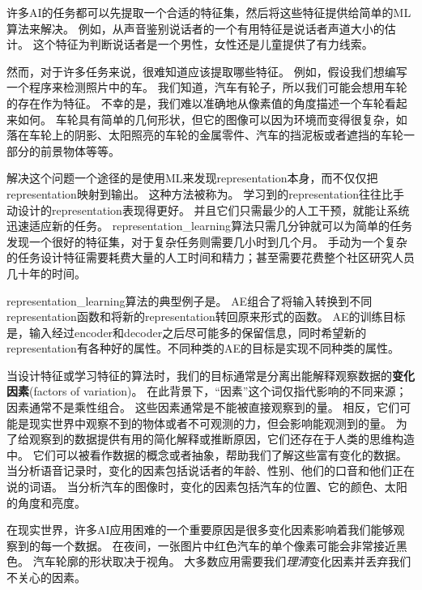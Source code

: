 许多\gls{AI}的任务都可以先提取一个合适的特征集，然后将这些特征提供给简单的\gls{ML}算法来解决。
例如，从声音鉴别说话者的一个有用特征是说话者声道大小的估计。
这个特征为判断说话者是一个男性，女性还是儿童提供了有力线索。

然而，对于许多任务来说，很难知道应该提取哪些特征。
例如，假设我们想编写一个程序来检测照片中的车。
我们知道，汽车有轮子，所以我们可能会想用车轮的存在作为特征。
不幸的是，我们难以准确地从像素值的角度描述一个车轮看起来如何。
车轮具有简单的几何形状，但它的图像可以因为环境而变得很复杂，如落在车轮上的阴影、太阳照亮的车轮的金属零件、汽车的挡泥板或者遮挡的车轮一部分的前景物体等等。


解决这个问题一个途径的是使用\gls{ML}来发现\gls{representation}本身，而不仅仅把\gls{representation}映射到输出。
这种方法被称为。
学习到的\gls{representation}往往比手动设计的\gls{representation}表现得更好。
并且它们只需最少的人工干预，就能让系统迅速适应新的任务。
\gls{representation_learning}算法只需几分钟就可以为简单的任务发现一个很好的特征集，对于复杂任务则需要几小时到几个月。
手动为一个复杂的任务设计特征需要耗费大量的人工时间和精力；甚至需要花费整个社区研究人员几十年的时间。

\gls{representation_learning}算法的典型例子是。
\gls{AE}组合了将输入转换到不同\gls{representation}函数和将新的\gls{representation}转回原来形式的函数。 
\gls{AE}的训练目标是，输入经过\gls{encoder}和\gls{decoder}之后尽可能多的保留信息，同时希望新的\gls{representation}有各种好的属性。不同种类的\gls{AE}的目标是实现不同种类的属性。

当设计特征或学习特征的算法时，我们的目标通常是分离出能解释观察数据的\textbf{变化因素}(factors of variation)。
在此背景下，``因素''这个词仅指代影响的不同来源；因素通常不是乘性组合。
这些因素通常是不能被直接观察到的量。
相反，它们可能是现实世界中观察不到的物体或者不可观测的力，但会影响能观测到的量。
为了给观察到的数据提供有用的简化解释或推断原因，它们还存在于人类的思维构造中。
它们可以被看作数据的概念或者抽象，帮助我们了解这些富有变化的数据。
当分析语音记录时，变化的因素包括说话者的年龄、性别、他们的口音和他们正在说的词语。
当分析汽车的图像时，变化的因素包括汽车的位置、它的颜色、太阳的角度和亮度。


在现实世界，许多\gls{AI}应用困难的一个重要原因是很多变化因素影响着我们能够观察到的每一个数据。
在夜间，一张图片中红色汽车的单个像素可能会非常接近黑色。
汽车轮廓的形状取决于视角。
大多数应用需要我们\emph{理清}变化因素并丢弃我们不关心的因素。


